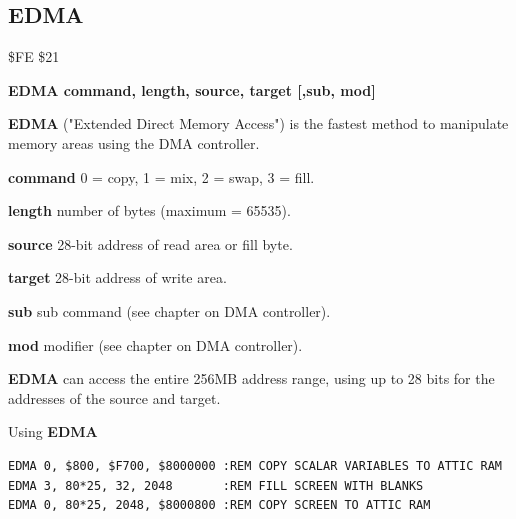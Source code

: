 \subsection{EDMA}
\label{BASIC 65 Commands!EDMA}
\begin{description}[leftmargin=2cm,style=nextline]
\item [Token:] \$FE \$21
\item [Format:] {\bf EDMA command, length, source,
                 target [,sub, mod]}
\item [Usage:]
   {\bf EDMA} ("Extended Direct Memory Access") is the fastest method
   to manipulate memory areas using the DMA controller.

   {\bf command} 0 = copy, 1 = mix, 2 = swap, 3 = fill.

   {\bf length} number of bytes (maximum = 65535).

   {\bf source}  28-bit address of read area or fill byte.

   {\bf target} 28-bit address of write area.

   {\bf sub} sub command (see chapter on DMA controller).

   {\bf mod} modifier (see chapter on DMA controller).

\item [Remarks:]
{\bf EDMA} can access the entire 256MB address range,
using up to 28 bits for the addresses of the source and target.
\item [Examples:] Using {\bf EDMA}
\begin{tcolorbox}[colback=black,coltext=white]
\verbatimfont{\codefont}
\begin{verbatim}
EDMA 0, $800, $F700, $8000000 :REM COPY SCALAR VARIABLES TO ATTIC RAM
EDMA 3, 80*25, 32, 2048       :REM FILL SCREEN WITH BLANKS
EDMA 0, 80*25, 2048, $8000800 :REM COPY SCREEN TO ATTIC RAM
\end{verbatim}
\end{tcolorbox}
\end{description}


\newpage
